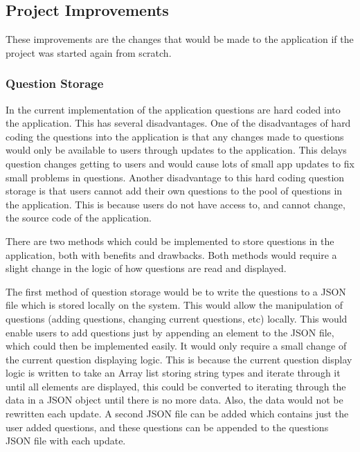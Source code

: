 \documentclass{article}
\begin{document}
\subsection{Project Improvements}

These improvements are the changes that would be made to the application if the project was started again from scratch. 

\subsubsection{Question Storage}

In the current implementation of the application questions are hard coded into the application. This has several disadvantages. One of the disadvantages of hard coding the questions into the application is that any changes made to questions would only be available to users through updates to the application. This delays question changes getting to users and would cause lots of small app updates to fix small problems in questions. Another disadvantage to this hard coding question storage is that users cannot add their own questions to the pool of questions in the application. This is because users do not have access to, and cannot change, the source code of the application. \par

There are two methods which could be implemented to store questions in the application, both with benefits and drawbacks. Both methods would require a slight change in the logic of how questions are read and displayed. \par

The first method of question storage would be to write the questions to a JSON file which is stored locally on the system. This would allow the manipulation of questions (adding questions, changing current questions, etc) locally. This would enable users to add questions just by appending an element to the JSON file, which could then be implemented easily. It would only require a small change of the current question displaying logic. This is because the current question display logic is written to take an Array list storing string types and iterate through it until all elements are displayed, this could be converted to iterating through the data in a JSON object until there is no more data. Also, the data would not be rewritten each update. A second JSON file can be added which contains just the user added questions, and these questions can be appended to the questions JSON file with each update. \par
\end{document}
